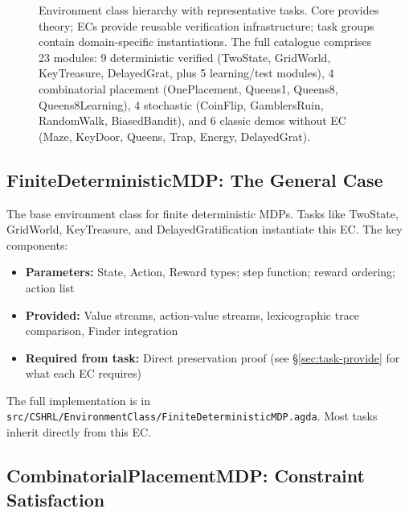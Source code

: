 \documentclass[9pt,a4paper]{article}
\newcommand{\fpath}[1]{\nolinkurl{#1}}
\theoremstyle{plain}
\theoremstyle{definition}
\theoremstyle{remark}
\begin{document}
\begin{figure}[H]
\caption{Environment class hierarchy with representative tasks. Core provides theory; ECs provide reusable verification infrastructure; task groups contain domain-specific instantiations. The full catalogue comprises 23 modules: 9 deterministic verified (TwoState, GridWorld, KeyTreasure, DelayedGrat, plus 5 learning/test modules), 4 combinatorial placement (OnePlacement, Queens1, Queens8, Queens8Learning), 4 stochastic (CoinFlip, GamblersRuin, RandomWalk, BiasedBandit), and 6 classic demos without EC (Maze, KeyDoor, Queens, Trap, Energy, DelayedGrat).}
\end{figure}

\subsection{FiniteDeterministicMDP: The General Case}

The base environment class for finite deterministic MDPs. Tasks like TwoState, GridWorld, KeyTreasure, and DelayedGratification instantiate this EC. The key components:

\begin{itemize}
\item \textbf{Parameters:} State, Action, Reward types; step function; reward ordering; action list
\item \textbf{Provided:} Value streams, action-value streams, lexicographic trace comparison, Finder integration
\item \textbf{Required from task:} Direct preservation proof (see \S\ref{sec:task-provide} for what each EC requires)
\end{itemize}

\noindent The full implementation is in \fpath{src/CSHRL/EnvironmentClass/FiniteDeterministicMDP.agda}. Most tasks inherit directly from this EC.

\subsection{CombinatorialPlacementMDP: Constraint Satisfaction}\label{sec:cpmdp}
\end{document}

